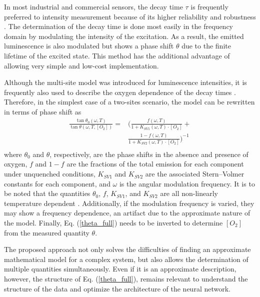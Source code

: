 \documentclass[final,5p,times,twocolumn]{elsarticle}
\begin{document}
In most industrial and commercial sensors, the decay time $\tau$ is frequently preferred to intensity measurement because of its higher reliability and robustness \cite{Wei2019}. The determination of the decay time is done most easily in the frequency domain by modulating the intensity of the excitation.  As a result, the emitted luminescence is also modulated but shows a phase shift $\theta$ due to the finite lifetime of the excited state. This method has the additional advantage of allowing very simple and low-cost implementation.

Although the multi-site model was introduced for luminescence intensities, it is frequently also used to describe the oxygen dependence of the decay times \cite{Demas1995,Quaranta2012}. Therefore, in the simplest case of a two-sites scenario, the model can be rewritten in terms of phase shift as \cite{Michelucci2019}
\begin{equation}
\begin{aligned}
\frac{\tan \theta_0 (\omega, T)}{\tan \theta (\omega, T, [O_2])}=
 & \bigg( \frac{f (\omega , T) }{1+K_{SV1} (\omega , T) \cdot \left[O_2\right]}+ \\
&\frac{1-f (\omega , T) }{1+K_{SV2} (\omega , T) \cdot \left[O_2\right]} \bigg)^{-1} \\
\label{theta_full}
\end{aligned}
\end{equation}
where $\theta_0$ and $\theta$, respectively, are the phase shifts in the absence and presence of oxygen, $f$ and $1-f$ are the fractions of the total emission for each component under unquenched conditions, $K_{SV1}$ and $K_{SV2}$ are the associated Stern–Volmer constants for each component, and $\omega$ is the angular modulation frequency. It is to be noted that the quantities $\theta_0$, $f$, $K_{SV1}$, and $K_{SV2}$ are all non-linearly temperature dependent \cite{Ogurtsov2006,lo2008,Zaitsev2016}. Additionally, if the modulation frequency is varied, they may show a frequency dependence, an artifact due to the approximate nature of the model. Finally, Eq. (\ref{theta_full}) needs to be inverted to determine $[O_2]$ from the measured quantity $\theta$.

The proposed approach not only solves the difficulties of finding an approximate mathematical model for a complex system, but also allows the determination of multiple quantities simultaneously. Even if it is an approximate description, however, the structure of Eq. (\ref{theta_full}), remains relevant to understand the structure of the data and optimize the architecture of the neural network.
\end{document}

